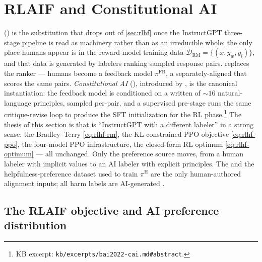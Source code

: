 
\section{RLAIF and Constitutional AI}
\label{sec:rlaif-cai}

 () is the substitution
that drops out of \cref{sec:rlhf} once the InstructGPT three-stage
pipeline is read as machinery rather than as an irreducible whole:
the only place humans appear is in the reward-model training data
$\mathcal{D}_{\mathrm{RM}} = \{(x, y_w, y_l)\}$, and that data is
generated by labelers ranking sampled response pairs.  replaces
the ranker — humans become a feedback model $\pi^{\mathrm{FB}}$, a
separately-aligned  that scores the same pairs. \emph{Constitutional
AI} (), introduced by \citet{bai2022-cai}, is the canonical 
instantiation: the feedback model is conditioned on a written
\emph{} of $\sim\!16$ natural-language principles, sampled
per-pair, and a supervised pre-stage runs the same critique-revise loop
to produce the SFT initialization for the RL phase.\footnote{KB
excerpt: \nolinkurl{kb/excerpts/bai2022-cai.md#abstract}.} The thesis of
this section is that  is ``InstructGPT with a different labeler''
in a strong sense: the Bradley--Terry 
\cref{eq:rlhf-rm}, the KL-constrained PPO objective \cref{eq:rlhf-ppo},
the four-model PPO infrastructure, the closed-form RL optimum
\cref{eq:rlhf-optimum} — all unchanged. Only the preference source
moves, from a human labeler with implicit values to an AI labeler with
explicit principles. The  and the helpfulness-preference
dataset used to train $\pi^{\mathrm{H}}$ are the only human-authored
alignment inputs; all harm labels are AI-generated \citep[\S abstract, \S 4]{bai2022-cai}.

\subsection{The RLAIF objective and AI preference distribution}
\label{sec:rlaif-objective}

